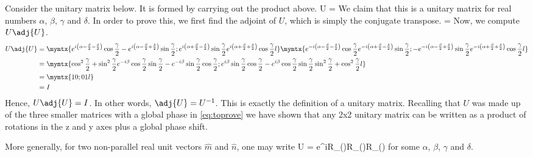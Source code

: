 Consider the unitary matrix below. It is formed by carrying out the product above.
\beq
U = 
\eeq
We claim that this is a unitary matrix for real numbers $\alpha$, $\beta$, $\gamma$ and $\delta$. In order to prove this, we first find the adjoint of $U$, which is simply the conjugate transpose.
\beq
{} = 
\eeq
Now, we compute $U\adj{U}$.
\begin{align}
U\adj{U} &= \mymtx{e^{i\left(\alpha-\frac{\beta}{2}-\frac{\delta}{2}\right)}\cos\frac{\gamma}{2} -e^{i\left(\alpha-\frac{\beta}{2}+\frac{\delta}{2}\right)}\sin\frac{\gamma}{2}; e^{i\left(\alpha+\frac{\beta}{2}-\frac{\delta}{2}\right)}\sin\frac{\gamma}{2} e^{i\left(\alpha+\frac{\beta}{2}+\frac{\delta}{2}\right)}\cos\frac{\gamma}{2}l}\mymtx{e^{-i\left(\alpha-\frac{\beta}{2}-\frac{\delta}{2}\right)}\cos\frac{\gamma}{2} e^{-i\left(\alpha+\frac{\beta}{2}-\frac{\delta}{2}\right)}\sin\frac{\gamma}{2}; -e^{-i\left(\alpha-\frac{\beta}{2}+\frac{\delta}{2}\right)}\sin\frac{\gamma}{2} e^{-i\left(\alpha+\frac{\beta}{2}+\frac{\delta}{2}\right)}\cos\frac{\gamma}{2}l}\\
&= \mymtx{\cos^2\frac{\gamma}{2}+\sin^2\frac{\gamma}{2} e^{-i\beta}\cos\frac{\gamma}{2}\sin\frac{\gamma}{2}-e^{-i\beta}\sin\frac{\gamma}{2}\cos\frac{\gamma}{2}; e^{i\beta}\sin\frac{\gamma}{2}\cos\frac{\gamma}{2}-e^{i\beta}\cos\frac{\gamma}{2}\sin\frac{\gamma}{2} \sin^2\frac{\gamma}{2}+\cos^2\frac{\gamma}{2}l}\\
&= \mymtx{1 0;0 1l}\\
&= I
\end{align}
Hence, $U\adj{U} = I$. In other words, $\adj{U} = U^{-1}$. This is exactly the definition of a unitary matrix. Recalling that $U$ was made up of the three smaller matrices with a global phase in \eqref{eq:toprove} we have shown that any 2x2 unitary matrix can be written as a product of rotations in the z and y axes plus a global phase shift.

More generally, for two non-parallel real unit vectors $\hat{m}$ and $\hat{n}$, one may write
\beq
U = e^{i\alpha}R_{}(\beta)R_{}(\gamma)R_{}(\delta)
\eeq
for some $\alpha$, $\beta$, $\gamma$ and $\delta$.
